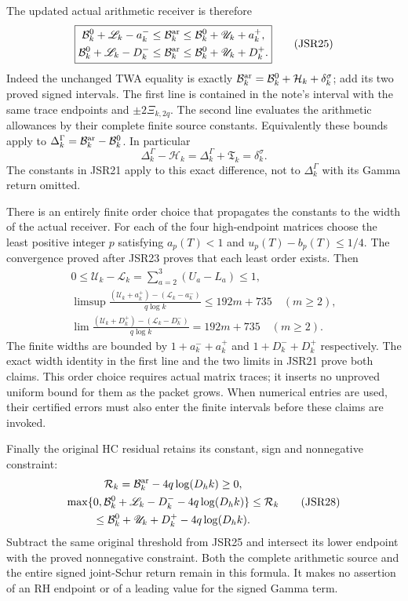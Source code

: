 \documentclass[11pt,a4paper]{article}
\begin{document}
The updated actual arithmetic receiver is therefore
\[
\boxed{\begin{aligned}
 \mathcal B_k^0+\mathscr L_k-a_k^-
 &\leq\mathcal B_k^{\rm ar}
 \leq\mathcal B_k^0+\mathscr U_k+a_k^+,\\
 \mathcal B_k^0+\mathscr L_k-D_k^-
 &\leq\mathcal B_k^{\rm ar}
 \leq\mathcal B_k^0+\mathscr U_k+D_k^+.
\end{aligned}}\tag{JSR25}
\]
Indeed the unchanged TWA equality is exactly
$\mathcal B_k^{\rm ar}=\mathcal B_k^0+
\mathcal H_k+\delta_k^\sigma$; add its two proved
signed intervals. The first line is contained in the
note's interval with the same trace endpoints and
$\pm2\Xi_{k,2q}$. The second line evaluates the arithmetic
allowances by their complete finite source constants.
Equivalently these bounds apply to
$\Delta_k^\Gamma=\mathcal B_k^{\rm ar}-\mathcal B_k^0$.
In particular
\[
 \Delta_k^\Gamma-\mathcal H_k
 =\Delta_k^\Gamma+\mathfrak T_k=\delta_k^\sigma.
 \tag{JSR26}
\]
The constants in JSR21 apply to this exact difference,
not to $\Delta_k^\Gamma$ with its Gamma return omitted.

There is an entirely finite order choice that propagates
the constants to the width of the actual receiver.
For each of the four high-endpoint matrices choose the least positive
integer $p$ satisfying $a_p(T)<1$ and
$u_p(T)-b_p(T)\leq1/4$. The convergence proved after
JSR23 proves that each least order exists. Then
\[
\begin{gathered}
 0\leq\mathscr U_k-\mathscr L_k
   =\sum_{a=2}^3(U_a-L_a)\leq1,\\
 \limsup\frac{
   (\mathscr U_k+a_k^+)-(\mathscr L_k-a_k^-)}{q\log k}
   \leq192m+735\quad(m\geq2),\\
 \lim\frac{
   (\mathscr U_k+D_k^+)-(\mathscr L_k-D_k^-)}{q\log k}
   =192m+735\quad(m\geq2).
\end{gathered}\tag{JSR27}
\]
The finite widths are bounded by
$1+a_k^-+a_k^+$ and $1+D_k^-+D_k^+$ respectively.
The exact width identity in the first line and the
two limits in JSR21 prove both claims. This order choice
requires actual matrix traces; it inserts no unproved
uniform bound for them as the packet grows. When numerical
entries are used, their certified errors must also enter
the finite intervals before these claims are invoked.

Finally the original HC residual retains its constant,
sign and nonnegative constraint:
\[
\begin{gathered}
 \mathcal R_k=\mathcal B_k^{\rm ar}-4q\log(D_hk)\geq0,\\
 \max\{0,\mathcal B_k^0+\mathscr L_k-D_k^-
                         -4q\log(D_hk)\}
 \leq\mathcal R_k\\
 \leq\mathcal B_k^0+\mathscr U_k+D_k^+
                         -4q\log(D_hk).
\end{gathered}\tag{JSR28}
\]
Subtract the same original threshold from JSR25 and
intersect its lower endpoint with the proved nonnegative
constraint. Both the complete arithmetic source and the
entire signed joint-Schur return remain in this formula.
It makes no assertion of an RH endpoint or of a leading
value for the signed Gamma term.
\end{document}
